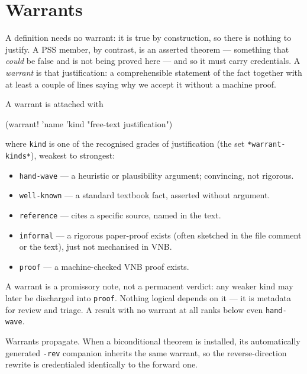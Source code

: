 \section{Warrants}
\label{sec:warrants}

A definition needs no warrant: it is true by construction, so there is
nothing to justify.  A PSS member, by contrast, is an asserted theorem ---
something that \emph{could} be false and is not being proved here --- and
so it must carry credentials.  A \emph{warrant} is that justification: a
comprehensible statement of the fact together with at least a couple of
lines saying why we accept it without a machine proof.

A warrant is attached with

\begin{VNBsnip}
(warrant! 'name 'kind "free-text justification")
\end{VNBsnip}

\noindent
where \texttt{kind} is one of the recognised grades of justification (the
set \texttt{*warrant-kinds*}), weakest to strongest:

\begin{itemize}
\item \texttt{hand-wave} --- a heuristic or plausibility argument;
  convincing, not rigorous.
\item \texttt{well-known} --- a standard textbook fact, asserted without
  argument.
\item \texttt{reference} --- cites a specific source, named in the text.
\item \texttt{informal} --- a rigorous paper-proof exists (often sketched
  in the file comment or the text), just not mechanised in VNB.
\item \texttt{proof} --- a machine-checked VNB proof exists.
\end{itemize}

\begin{remark}
A warrant is a promissory note, not a permanent verdict: any weaker kind
may later be discharged into \texttt{proof}.  Nothing logical depends on
it --- it is metadata for review and triage.  A result with no warrant at
all ranks below even \texttt{hand-wave}.
\end{remark}

\begin{remark}
Warrants propagate.  When a biconditional theorem is installed, its
automatically generated \texttt{-rev} companion inherits the same warrant,
so the reverse-direction rewrite is credentialed identically to the
forward one.
\end{remark}

